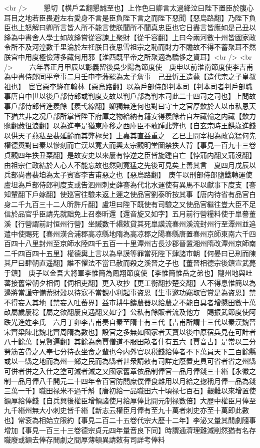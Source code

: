<br />
　　懇切【横戶孟翻懇誠至也】上作色曰卿言太過絳泣曰陛下置臣於腹心耳目之地若臣畏避左右愛身不言是臣負陛下言之而陛下惡聞【惡烏路翻】乃陛下負臣也上怒解曰卿所言皆人所不能言使朕聞所不聞真忠臣也它日盡言皆應如是己丑以絳為中書舍人學士如故絳嘗從容諫上聚財【從千容翻】上曰今兩河數十州皆國家政令所不及河湟數千里淪於左祍朕日夜思雪祖宗之恥而財力不贍故不得不蓄聚耳不然朕宫中用度極儉薄多藏何用邪【淮西既平帝之所聚適為驕侈之資耳】<br />
<br />
　　六年春正月甲辰以彰義留後吳少陽為節度使　庚申以前淮南節度使李吉甫為中書侍郎同平章事二月壬申李藩罷為太子詹事　己丑忻王造薨【造代宗之子皇叔祖也】　宦官惡李絳在翰林【惡烏路翻】以為戶部侍郎判本司【判本司者判戶部職事唐自中世以後戶部侍郎或判度支故以判戶部為判本司此二十四司之司也】上問故事戶部侍郎皆進羨餘【羨弋線翻】卿獨無進何也對曰守土之官厚歛於人以市私恩天下猶共非之况戶部所掌皆陛下府庫之物給納有籍安得羨餘若自左藏輸之内藏【歛力贍翻藏徂浪翻】以為進奉是猶東庫移之西庫臣不敢踵此弊也【自玄宗時王鉷歲進錢以供天子燕私至裴延齡而其弊極矣】上嘉其直益重之　乙巳上問宰相為政寛猛何先權德輿對曰秦以慘刻而亡漢以寛大而興太宗觀明堂圖禁抶人背【事見一百九十三卷貞觀四年抶丑栗翻】是故安史以來屢有悖逆之臣皆旋踵自亡【悖蒲内翻又蒲沒翻】由祖宗仁政結於人心人不能忘故也然則寛猛之先後可見矣上善其言　夏四月戊辰以兵部尚書裴垍為太子賓客李吉甫惡之也【惡烏路翻】　庚午以刑部侍郎鹽鐵轉運使盧坦為戶部侍郎判度支或告泗州刺史薛謇為代北水運使有異馬不以獻事下度支【謇知輦翻下戶嫁翻】使廵官往驗未返上遲之使品官劉泰昕按其事【唐内待省有品官白身二千九百三十二人昕許斤翻】盧坦曰陛下既使有司驗之又使品官繼往豈大臣不足信於品官乎臣請先就黜免上召泰昕還【還音旋又如字】五月前行營糧料使于臯謩董溪【行營謂前討恒州行營】坐贓數千緡敕貸其死臯謨流春州溪流封州行至潭州並追遣中使賜死【春州漢合浦郡高凉縣地隋為高凉郡之陽春縣唐置春州京師東南六千四百四十八里封州至京師水陸四千五百一十里潭州古長沙郡晉置湘州隋改潭州京師南二千四百四十五里】權德輿上言以為臯謨等罪當死陛下肆諸市朝【何晏曰已刑而陳其尸曰肆朝直遥翻】誰不懼法不當已赦而殺之溪晉之子也【董晉相德宗後鎮宣武薨于鎮】　庚子以金吾大將軍李惟簡為鳳翔節度使【李惟簡惟岳之弟也】隴州地與吐蕃接舊常朝夕相伺【伺相吏翻】更入攻抄【更工衡翻抄楚交翻】人不得息惟簡以為邊將當謹守備蓄財穀以待寇不當覩小利起事盗恩【生事邀功竊取官賞是為盗恩】禁不得妄入其地【禁妄入吐蕃界】益市耕牛鑄農器以給農之不能自具者增懇田數十萬畝屬歲屢稔【屬之欲翻屢良遇翻又如字】公私有餘販者流及他方　賜振武節度使阿跌光進姓李氏　六月丁卯李吉甫奏自秦至隋十有三代【吉甫所謂十三代以秦漢魏晉宋齊梁陳北魏北齊周隋為數也】設官之多無如國家者天寶以後中原宿兵見在可計者八十餘萬【見賢遍翻】其餘為啇賈僧道不服田畝者什有五六【賈音古】是常以三分勞筋苦骨之人奉七分待衣坐食之輩也今内外官以税錢給俸者不下萬員天下三百餘縣或以一縣之地而為州一鄉之民而為縣者甚衆請敕有司詳定廢置吏員可省者省之州縣可併者併之入仕之塗可減者減之又國家舊章依品制俸官一品月俸錢三十緡【永徽之制一品月俸八千開元二十四年令百官防閤庶僕俸食雜用以月給之揔稱月俸一品為錢三萬一千】職田禄米不過千斛【唐初給一品職田六十頃禄七百石】艱難以來增置使額厚給俸錢【自兵興後權臣增領諸使月給厚俸比開元制禄數倍】大歷中權臣月俸至九千緡州無大小刺史皆千緡【新志云權臣月俸有至九十萬者刺史亦至十萬即此數也】常衮為相始立限約【事見二百二十五卷代宗大歷十二年】李泌又量其閒劇隨事增加【事見一百三十三卷德宗貞元四年量音良下同】時謂通濟理難減削然猶有名存職廢或額去俸存閒劇之間厚薄頓異請敕有司詳考俸料